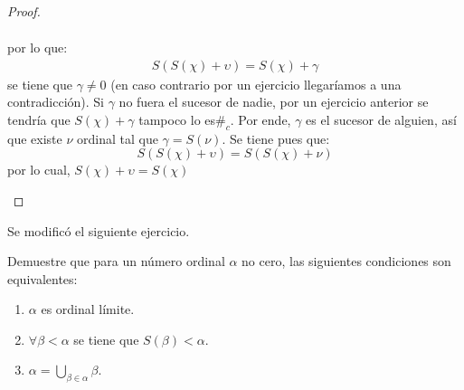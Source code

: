 \documentclass[12pt]{report}
\newcounter{it}
\theoremstyle{largebreak}
\newcommand\contradiction{\ensuremath{\#_c}}
\begin{document}
\begin{proof}
\begin{itemize}
\begin{itemize}
\begin{equation*}
\begin{split}
                    \end{split}
                \end{equation*}
                por lo que:
                \begin{equation*}
                    \begin{split}
                        S(S(\chi)+\upsilon)=S(\chi)+\gamma
                    \end{split}
                \end{equation*}
                se tiene que $\gamma\neq0$ (en caso contrario por un ejercicio llegaríamos a una contradicción). Si $\gamma$ no fuera el sucesor de nadie, por un ejercicio anterior se tendría que $S(\chi)+\gamma$ tampoco lo es\contradiction. Por ende, $\gamma$ es el sucesor de alguien, así que existe $\nu$ ordinal tal que $\gamma=S(\nu)$. Se tiene pues que:
                \begin{equation*}
                    S(S(\chi)+\upsilon)=S(S(\chi)+\nu)
                \end{equation*}
                por lo cual, $S(\chi)+\upsilon=S(\chi)$%
            \end{itemize}
        \end{itemize}
    \end{proof}

    \begin{obs}
        Se modificó el siguiente ejercicio.
    \end{obs}

    \begin{excer}
        Demuestre que para un número ordinal $\alpha$ no cero, las siguientes condiciones son equivalentes:
        \begin{enumerate}[label = \textit{(\arabic*)}]
            \item $\alpha$ es ordinal límite.
            \item $\forall\beta<\alpha$ se tiene que $S(\beta)<\alpha$.
            \item $\alpha=\bigcup_{\beta\in\alpha}\beta$.
        \end{enumerate}
    \end{excer}
\end{document}
